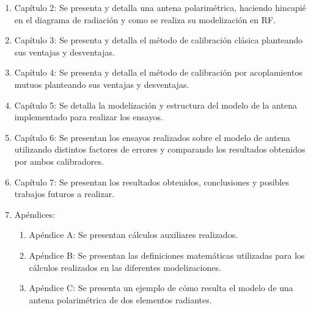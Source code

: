 \begin{enumerate}
	\item Capítulo 2: Se presenta y detalla una antena polarimétrica, haciendo hincapié en el diagrama de radiación y como
    se realiza su modelización en RF.
	\item Capítulo 3: Se presenta y detalla el método de calibración clásica planteando sus ventajas y desventajas.
	\item Capítulo 4: Se presenta y detalla el método de calibración por acoplamientos mutuos planteando sus ventajas y
		desventajas.
	\item Capítulo 5: Se detalla la modelización y estructura del modelo de la antena implementado para realizar los ensayos.
	\item Capítulo 6: Se presentan los ensayos realizados sobre el modelo de antena utilizando distintos factores de errores y
		comparando los resultados obtenidos por ambos calibradores.
	\item Capítulo 7: Se presentan los resultados obtenidos, conclusiones y posibles trabajos futuros a realizar.
	\item Apéndices:
		\begin{enumerate}
			\item Apéndice A: Se presentan cálculos auxiliares realizados.
			\item Apéndice B: Se presentan las definiciones matemáticas utilizadas para los cálculos realizados en las diferentes 
				modelizaciones.
			\item Apéndice C: Se presenta un ejemplo de cómo resulta el modelo de una antena polarimétrica de dos elementos radiantes.
		\end{enumerate}
\end{enumerate}

